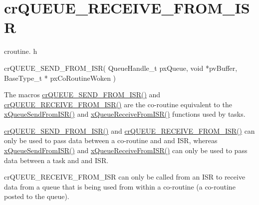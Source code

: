 \hypertarget{group__cr_q_u_e_u_e___r_e_c_e_i_v_e___f_r_o_m___i_s_r}{}\section{cr\+Q\+U\+E\+U\+E\+\_\+\+R\+E\+C\+E\+I\+V\+E\+\_\+\+F\+R\+O\+M\+\_\+\+I\+SR}
\label{group__cr_q_u_e_u_e___r_e_c_e_i_v_e___f_r_o_m___i_s_r}
croutine. h 
\begin{DoxyPre}
crQUEUE\_SEND\_FROM\_ISR(
                         QueueHandle\_t pxQueue,
                         void *pvBuffer,
                         BaseType\_t * pxCoRoutineWoken
                    )
\end{DoxyPre}


The macro\textquotesingle{}s \hyperlink{vendor_2ceedling_2plugins_2freertos_2src_2freertos_2include_2croutine_8h_ac8eb0a81c5cf69de7e4edd73ce44a3be}{cr\+Q\+U\+E\+U\+E\+\_\+\+S\+E\+N\+D\+\_\+\+F\+R\+O\+M\+\_\+\+I\+S\+R()} and \hyperlink{vendor_2ceedling_2plugins_2freertos_2src_2freertos_2include_2croutine_8h_a9c0fa977ca69adbddb4811affa2a71f7}{cr\+Q\+U\+E\+U\+E\+\_\+\+R\+E\+C\+E\+I\+V\+E\+\_\+\+F\+R\+O\+M\+\_\+\+I\+S\+R()} are the co-\/routine equivalent to the \hyperlink{externals_2freertos_2include_2queue_8h_a21d5919ed26c21d121df4a4debeb643c}{x\+Queue\+Send\+From\+I\+S\+R()} and \hyperlink{externals_2freertos_2include_2queue_8h_acdf528f5c91131ae2f31c669cfd65758}{x\+Queue\+Receive\+From\+I\+S\+R()} functions used by tasks.

\hyperlink{vendor_2ceedling_2plugins_2freertos_2src_2freertos_2include_2croutine_8h_ac8eb0a81c5cf69de7e4edd73ce44a3be}{cr\+Q\+U\+E\+U\+E\+\_\+\+S\+E\+N\+D\+\_\+\+F\+R\+O\+M\+\_\+\+I\+S\+R()} and \hyperlink{vendor_2ceedling_2plugins_2freertos_2src_2freertos_2include_2croutine_8h_a9c0fa977ca69adbddb4811affa2a71f7}{cr\+Q\+U\+E\+U\+E\+\_\+\+R\+E\+C\+E\+I\+V\+E\+\_\+\+F\+R\+O\+M\+\_\+\+I\+S\+R()} can only be used to pass data between a co-\/routine and and I\+SR, whereas \hyperlink{externals_2freertos_2include_2queue_8h_a21d5919ed26c21d121df4a4debeb643c}{x\+Queue\+Send\+From\+I\+S\+R()} and \hyperlink{externals_2freertos_2include_2queue_8h_acdf528f5c91131ae2f31c669cfd65758}{x\+Queue\+Receive\+From\+I\+S\+R()} can only be used to pass data between a task and and I\+SR.

cr\+Q\+U\+E\+U\+E\+\_\+\+R\+E\+C\+E\+I\+V\+E\+\_\+\+F\+R\+O\+M\+\_\+\+I\+SR can only be called from an I\+SR to receive data from a queue that is being used from within a co-\/routine (a co-\/routine posted to the queue).

